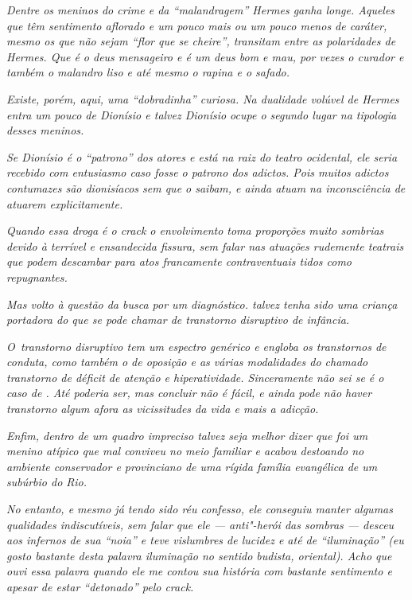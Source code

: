 \emph{Dentre os meninos do crime e da ``malandragem'' Hermes ganha
longe. Aqueles que têm sentimento aflorado e um pouco mais ou um pouco
menos de caráter, mesmo os que não sejam ``flor que se cheire'',
transitam entre as polaridades de Hermes. Que é o deus mensageiro e é um
deus bom e mau, por vezes o curador e também o malandro liso e até mesmo
o rapina e o safado.}~

\emph{Existe, porém, aqui, uma ``dobradinha'' curiosa. Na dualidade
volúvel de Hermes entra um pouco de Dionísio e talvez Dionísio ocupe o
segundo lugar na tipologia desses meninos.}~

\emph{Se Dionísio é o ``patrono'' dos atores e está na raiz do teatro
ocidental, ele seria recebido com entusiasmo caso fosse o patrono dos
adictos. Pois muitos adictos contumazes são dionisíacos sem que o
saibam, e ainda atuam na inconsciência de atuarem explicitamente.}~

\emph{Quando essa droga é o crack o envolvimento toma proporções muito
sombrias devido à terrível e ensandecida fissura, sem falar nas atuações
rudemente teatrais que podem descambar para atos francamente
contraventuais tidos como repugnantes.}~

\emph{Mas volto à questão da busca por um diagnóstico.  talvez tenha
sido uma criança portadora do que se pode chamar de transtorno
disruptivo de infância.}~

\emph{O~transtorno disruptivo tem um espectro genérico e engloba os
transtornos de conduta, como também o de oposição e as várias
modalidades do chamado transtorno de déficit de atenção e
hiperatividade. Sinceramente não sei se é o caso de . Até poderia ser,
mas concluir não é fácil, e ainda pode não haver transtorno algum afora
as vicissitudes da vida e mais a adicção.}~

\emph{Enfim, dentro de um quadro impreciso talvez seja melhor dizer que
 foi um menino atípico que mal conviveu no meio familiar e acabou
destoando no ambiente conservador e provinciano de uma rígida família
evangélica de um subúrbio do Rio.}~

\emph{No entanto, e mesmo já tendo sido réu confesso, ele conseguiu
manter algumas qualidades indiscutíveis, sem falar que ele ---
anti"-herói das sombras --- desceu aos infernos de sua ``noia'' e teve
vislumbres de lucidez e até de ``iluminação'' (eu gosto bastante desta
palavra iluminação no sentido budista, oriental). Acho que ouvi essa
palavra quando ele me contou sua história com bastante sentimento e
apesar de estar ``detonado'' pelo crack.}~

